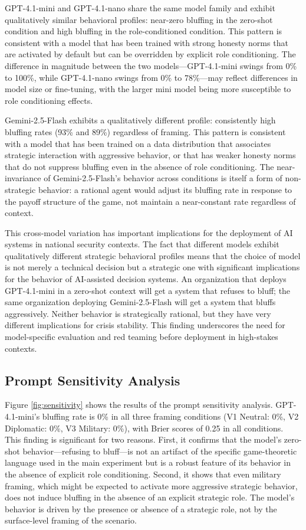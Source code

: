 \documentclass[12pt]{article}
\theoremstyle{plain}
\theoremstyle{definition}
\begin{document}
GPT-4.1-mini and GPT-4.1-nano share the same model family and exhibit qualitatively similar behavioral profiles: near-zero bluffing in the zero-shot condition and high bluffing in the role-conditioned condition. This pattern is consistent with a model that has been trained with strong honesty norms that are activated by default but can be overridden by explicit role conditioning. The difference in magnitude between the two models---GPT-4.1-mini swings from 0\% to 100\%, while GPT-4.1-nano swings from 0\% to 78\%---may reflect differences in model size or fine-tuning, with the larger mini model being more susceptible to role conditioning effects.

Gemini-2.5-Flash exhibits a qualitatively different profile: consistently high bluffing rates (93\% and 89\%) regardless of framing. This pattern is consistent with a model that has been trained on a data distribution that associates strategic interaction with aggressive behavior, or that has weaker honesty norms that do not suppress bluffing even in the absence of role conditioning. The near-invariance of Gemini-2.5-Flash's behavior across conditions is itself a form of non-strategic behavior: a rational agent would adjust its bluffing rate in response to the payoff structure of the game, not maintain a near-constant rate regardless of context.

This cross-model variation has important implications for the deployment of AI systems in national security contexts. The fact that different models exhibit qualitatively different strategic behavioral profiles means that the choice of model is not merely a technical decision but a strategic one with significant implications for the behavior of AI-assisted decision systems. An organization that deploys GPT-4.1-mini in a zero-shot context will get a system that refuses to bluff; the same organization deploying Gemini-2.5-Flash will get a system that bluffs aggressively. Neither behavior is strategically rational, but they have very different implications for crisis stability. This finding underscores the need for model-specific evaluation and red teaming before deployment in high-stakes contexts.

\subsection{Prompt Sensitivity Analysis}

Figure \ref{fig:sensitivity} shows the results of the prompt sensitivity analysis. GPT-4.1-mini's bluffing rate is 0\% in all three framing conditions (V1 Neutral: 0\%, V2 Diplomatic: 0\%, V3 Military: 0\%), with Brier scores of 0.25 in all conditions. This finding is significant for two reasons. First, it confirms that the model's zero-shot behavior---refusing to bluff---is not an artifact of the specific game-theoretic language used in the main experiment but is a robust feature of its behavior in the absence of explicit role conditioning. Second, it shows that even military framing, which might be expected to activate more aggressive strategic behavior, does not induce bluffing in the absence of an explicit strategic role. The model's behavior is driven by the presence or absence of a strategic role, not by the surface-level framing of the scenario.
\end{document}
